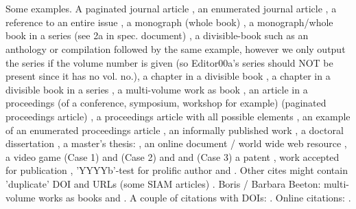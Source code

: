 \documentclass[sigplan,screen,anonymous]{acmart}
\begin{document}
\section{}
Some examples.  A paginated journal article \cite{Abril07}, an enumerated journal article \cite{Cohen07}, a reference to an entire issue \cite{JCohen96}, a monograph (whole book) \cite{Kosiur01}, a monograph/whole book in a series (see 2a in spec. document)
\cite{Harel79}, a divisible-book such as an anthology or compilation \cite{Editor00} followed by the same example, however we only output the series if the volume number is given \cite{Editor00a} (so Editor00a's series should NOT be present since it has no vol. no.),
a chapter in a divisible book \cite{Spector90}, a chapter in a divisible book in a series \cite{Douglass98}, a multi-volume work as book \cite{Knuth97}, an article in a proceedings (of a conference, symposium, workshop for example) (paginated proceedings article) \cite{Andler79}, a proceedings article with all possible elements \cite{Smith10}, an example of an enumerated proceedings article \cite{VanGundy07}, an informally published work \cite{Harel78}, a doctoral dissertation \cite{Clarkson85}, a master's thesis: \cite{anisi03}, an online document / world wide web resource \cite{Thornburg01, Ablamowicz07, Poker06}, a video game (Case 1) \cite{Obama08} and (Case 2) \cite{Novak03} and \cite{Lee05} and (Case 3) a patent \cite{JoeScientist001}, work accepted for publication \cite{rous08}, 'YYYYb'-test for prolific author \cite{SaeediMEJ10} and \cite{SaeediJETC10}. Other cites might contain 'duplicate' DOI and URLs (some SIAM articles) \cite{Kirschmer:2010:AEI:1958016.1958018}. Boris / Barbara Beeton: multi-volume works as books \cite{MR781536} and \cite{MR781537}. A couple of citations with DOIs: \cite{2004:ITE:1009386.1010128,Kirschmer:2010:AEI:1958016.1958018}. Online citations: \cite{TUGInstmem, Thornburg01, CTANacmart}.

%

%



%
\end{document}
